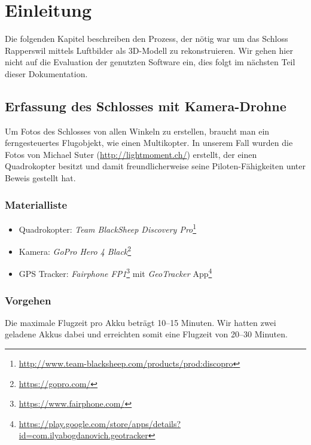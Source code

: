 \chapter{Einleitung}


Die folgenden Kapitel beschreiben den Prozess, der nötig war um das Schloss
Rapperswil mittels Luftbilder als 3D-Modell zu rekonstruieren. Wir gehen hier
nicht auf die Evaluation der genutzten Software ein, dies folgt im nächsten Teil
dieser Dokumentation.


\section{Erfassung des Schlosses mit Kamera-Drohne}

Um Fotos des Schlosses von allen Winkeln zu erstellen, braucht man ein
ferngesteuertes Flugobjekt, wie \zb{} einen Multikopter. In unserem Fall wurden
die Fotos von Michael Suter (\url{http://lightmoment.ch/}) erstellt, der einen
Quadrokopter besitzt und damit freundlicherweise seine Piloten-Fähigkeiten unter
Beweis gestellt hat.

\subsection{Materialliste}

\begin{itemize}
	\item Quadrokopter: \textit{Team BlackSheep Discovery
		Pro}\footnote{\url{http://www.team-blacksheep.com/products/prod:discopro}}
	\item Kamera: \textit{GoPro Hero 4 Black}\footnote{\url{https://gopro.com/}}
	\item GPS Tracker: \textit{Fairphone
		FP1}\footnote{\url{https://www.fairphone.com/}} mit
		\textit{GeoTracker}
		App\footnote{\url{https://play.google.com/store/apps/details?id=com.ilyabogdanovich.geotracker}}
\end{itemize}

\subsection{Vorgehen}

Die maximale Flugzeit pro Akku beträgt 10--15 Minuten. Wir hatten zwei geladene
Akkus dabei und erreichten somit eine Flugzeit von 20--30 Minuten.

